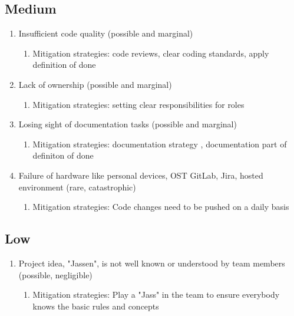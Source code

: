 \subsection{Medium}
\begin{enumerate}
    \item Insufficient code quality (possible and marginal) 
    \begin{enumerate}
        \item Mitigation strategies: code reviews, clear coding standards, apply definition of done 
    \end{enumerate}

    \item Lack of ownership (possible and marginal) 
    \begin{enumerate}
        \item Mitigation strategies: setting clear responsibilities for roles 
    \end{enumerate}

    \item Losing sight of documentation tasks (possible and marginal) 
    \begin{enumerate}
        \item Mitigation strategies: documentation strategy , documentation part of definiton of done 
    \end{enumerate}

    \item Failure of hardware like personal devices, OST GitLab, Jira, hosted environment (rare, catastrophic) 
    \begin{enumerate}
        \item Mitigation strategies: Code changes need to be pushed on a daily basis 
    \end{enumerate}
\end{enumerate}

\subsection{Low}
\begin{enumerate}
    \item Project idea, "Jassen", is not well known or understood by team members (possible, negligible) 
    \begin{enumerate}
        \item Mitigation strategies:  Play a "Jass" in the team to ensure everybody knows the basic rules and concepts 
    \end{enumerate}
\end{enumerate}

